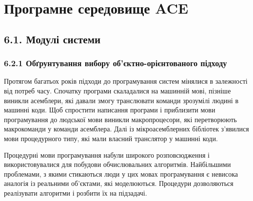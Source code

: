 \hypertarget{ux43fux440ux43eux433ux440ux430ux43cux43dux435-ux441ux435ux440ux435ux434ux43eux432ux438ux449ux435-ace}{%
\section[Програмне середовище
ACE]{\texorpdfstring{\protect\hypertarget{anchor-67}{}{}Програмне
середовище
ACE}{Програмне середовище ACE}}\label{ux43fux440ux43eux433ux440ux430ux43cux43dux435-ux441ux435ux440ux435ux434ux43eux432ux438ux449ux435-ace}}

\hypertarget{ux43cux43eux434ux443ux43bux456-ux441ux438ux441ux442ux435ux43cux438}{%
\subsection[6.1. Модулі
системи]{\texorpdfstring{\protect\hypertarget{anchor-68}{}{}6.1. Модулі
системи}{6.1. Модулі системи}}\label{ux43cux43eux434ux443ux43bux456-ux441ux438ux441ux442ux435ux43cux438}}

\hypertarget{ux43eux431ux491ux440ux443ux43dux442ux443ux432ux430ux43dux43dux44f-ux432ux438ux431ux43eux440ux443-ux43eux431ux454ux43aux442ux43dux43e-ux43eux440ux456ux454ux43dux442ux43eux432ux430ux43dux43eux433ux43e-ux43fux456ux434ux445ux43eux434ux443}{%
\subsubsection{6.2.1 Обґрунтування вибору об'єктно-орієнтованого
підходу}\label{ux43eux431ux491ux440ux443ux43dux442ux443ux432ux430ux43dux43dux44f-ux432ux438ux431ux43eux440ux443-ux43eux431ux454ux43aux442ux43dux43e-ux43eux440ux456ux454ux43dux442ux43eux432ux430ux43dux43eux433ux43e-ux43fux456ux434ux445ux43eux434ux443}}

Протягом багатьох років підходи до програмування систем мінялися в
залежності від потреб часу. Спочатку програми скаладалися на машинній
мові, пізніше виникли асемблери, які давали змогу транслювати команди
зрозумілі людині в машинні коди. Щоб спростити написання програми і
приблизити мови програмування до людської мови виникли макропроцесори,
які перетворюють макрокоманди у команди асемблера. Далі із
мікроасемблерних бібліотек з'явилися мови процедурного типу, які мали
власний транслятор у машинні коди.

Процедурні мови програмування набули широкого розповсюдження і
використовувалися для побудови обчислювальних алгоритмів. Найбільшими
проблемами, з якими стикаються люди у цих мовах програмування є невисока
аналогія із реальними об'єктами, які моделюються. Процедури дозволяються
реалізувати алгоритми і розбити їх на підзадачі.

